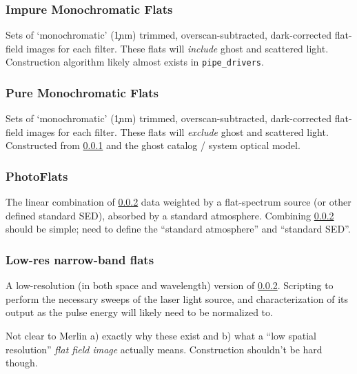 \subsubsection{Impure Monochromatic Flats}\label{sec:CPP:output:monoFlat}
Sets of `monochromatic' (\c 1nm) trimmed, overscan-subtracted, dark-corrected flat-field images for each filter. These flats will \emph{include} ghost and scattered light.
\alg Construction algorithm likely almost exists in \texttt{pipe\_drivers}.


\subsubsection{Pure Monochromatic Flats}\label{sec:CPP:output:monoPhotoFlat}
Sets of `monochromatic' (\c 1nm) trimmed, overscan-subtracted, dark-corrected flat-field images for each filter. These flats will \emph{exclude} ghost and scattered light.
\alg Constructed from \secsymbol\ref{sec:CPP:output:monoFlat} and the ghost catalog / system optical model.


\subsubsection{PhotoFlats}\label{sec:CPP:output:standardPhotoFlat}
The linear combination of \secsymbol\ref{sec:CPP:output:monoPhotoFlat} data weighted by a flat-spectrum source (or other defined standard SED), absorbed by a standard atmosphere.
\alg Combining \secsymbol\ref{sec:CPP:output:monoPhotoFlat} should be simple; need to define the ``standard atmosphere'' and ``standard SED''.


\subsubsection{Low-res narrow-band flats}\label{sec:CPP:output:monoPhotoFlatLowRes}
A low-resolution (in both space and wavelength) version of \secsymbol\ref{sec:CPP:output:monoPhotoFlat}.
\alg Scripting to perform the necessary sweeps of the laser light source, and characterization of its output as the pulse energy will likely need to be normalized to.
\begin{note}
	{Not clear to Merlin a) exactly why these exist and b) what a ``low spatial resolution'' \emph{flat field image} actually means. Construction shouldn't be hard though.}
\end{note}


